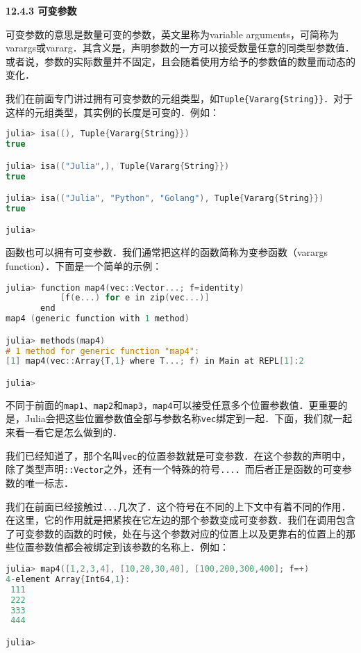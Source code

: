 \textbf{12.4.3 可变参数}

可变参数的意思是数量可变的参数，英文里称为variable arguments，可简称为varargs或vararg．其含义是，声明参数的一方可以接受数量任意的同类型参数值．或者说，参数的实际数量并不固定，且会随着使用方给予的参数值的数量而动态的变化．

我们在前面专门讲过拥有可变参数的元组类型，如\verb|Tuple{Vararg{String}}|．对于这样的元组类型，其实例的长度是可变的．例如：

\begin{lstlisting}[language=cpp]
julia> isa((), Tuple{Vararg{String}})
true

julia> isa(("Julia",), Tuple{Vararg{String}})
true

julia> isa(("Julia", "Python", "Golang"), Tuple{Vararg{String}})
true

julia> 
\end{lstlisting}

函数也可以拥有可变参数．我们通常把这样的函数简称为变参函数（varargs function）．下面是一个简单的示例：

\begin{lstlisting}[language=cpp]
julia> function map4(vec::Vector...; f=identity)
           [f(e...) for e in zip(vec...)]
       end
map4 (generic function with 1 method)

julia> methods(map4)
# 1 method for generic function "map4":
[1] map4(vec::Array{T,1} where T...; f) in Main at REPL[1]:2

julia>  
\end{lstlisting}

不同于前面的\verb|map1|、\verb|map2|和\verb|map3|，\verb|map4|可以接受任意多个位置参数值．更重要的是，Julia会把这些位置参数值全部与参数名称\verb|vec|绑定到一起．下面，我们就一起来看一看它是怎么做到的．

我们已经知道了，那个名叫\verb|vec|的位置参数就是可变参数．在这个参数的声明中，除了类型声明\verb|::Vector|之外，还有一个特殊的符号\verb|...|．而后者正是函数的可变参数的唯一标志．

我们在前面已经接触过\verb|...|几次了．这个符号在不同的上下文中有着不同的作用．在这里，它的作用就是把紧挨在它左边的那个参数变成可变参数．我们在调用包含了可变参数的函数的时候，处在与这个参数对应的位置上以及更靠右的位置上的那些位置参数值都会被绑定到该参数的名称上．例如：

\begin{lstlisting}[language=cpp]
julia> map4([1,2,3,4], [10,20,30,40], [100,200,300,400]; f=+)
4-element Array{Int64,1}:
 111
 222
 333
 444

julia> 
\end{lstlisting}


